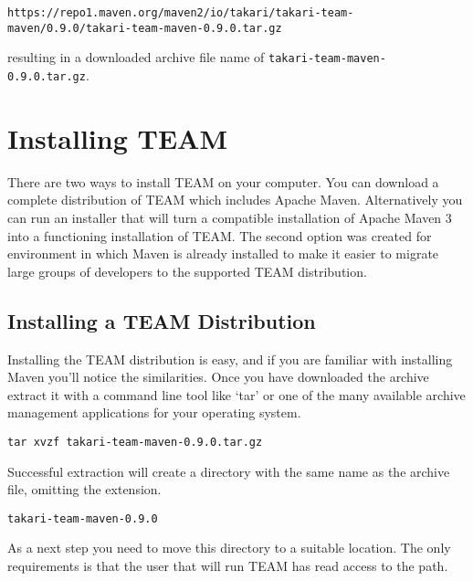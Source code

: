 \documentclass[a4paper]{book}
\newcounter{tab}[chapter]
\begin{document}
\begin{shaded}\begin{verbatim}
https://repo1.maven.org/maven2/io/takari/takari-team-maven/0.9.0/takari-team-maven-0.9.0.tar.gz
\end{verbatim}\end{shaded}

resulting in a downloaded archive file name of \texttt{takari-team-maven-0.9.0.tar.gz}.

\section{Installing TEAM}\label{installing-team-1}

There are two ways to install TEAM on your computer. You can download a complete distribution of TEAM which includes Apache Maven. Alternatively you can run an installer that will turn a compatible installation of Apache Maven 3 into a functioning installation of TEAM. The second option was created for environment in which Maven is already installed to make it easier to migrate large groups of developers to the supported TEAM distribution.

\subsection{Installing a TEAM Distribution}\label{installing-a-team-distribution}

Installing the TEAM distribution is easy, and if you are familiar with installing Maven you'll notice the similarities. Once you have downloaded the archive extract it with a command line tool like `tar' or one of the many available archive management applications for your operating system.

\begin{shaded}\begin{verbatim}
tar xvzf takari-team-maven-0.9.0.tar.gz
\end{verbatim}\end{shaded}

Successful extraction will create a directory with the same name as the archive file, omitting the extension.

\begin{shaded}\begin{verbatim}
takari-team-maven-0.9.0
\end{verbatim}\end{shaded}

As a next step you need to move this directory to a suitable location. The only requirements is that the user that will run TEAM has read access to the path.
\end{document}
